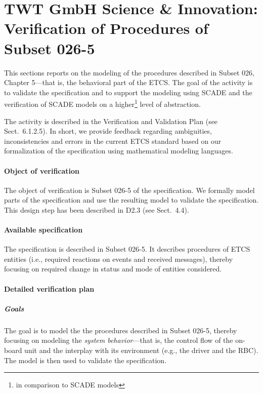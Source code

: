 \section{TWT GmbH Science \& Innovation: Verification of Procedures of Subset
026-5}

This sections reports on the modeling of the procedures described in Subset 026, Chapter 5---that is, the behavioral part of the ETCS. The goal of the activity is to validate the specification and to support the modeling using SCADE and the verification of SCADE models on a higher\footnote{in comparison to SCADE models} level of abstraction.

The activity is described in the Verification and Validation Plan (see Sect.~6.1.2.5). In short, we provide feedback regarding ambiguities, inconsistencies and errors in the current ETCS standard based on our formalization of the specification using mathematical modeling languages.

\paragraph{Object of verification}

The object of verification is Subset 026-5 of the specification. We formally model parts of the specification and use the resulting model to validate the specification. This design step has been described in D2.3 (see Sect.~4.4).

\paragraph{Available specification}

The specification is described in Subset 026-5. It describes procedures of ETCS entities (i.e., required reactions on events and received messages), thereby focusing on required change in status and mode of entities considered.


\paragraph{Detailed verification plan}

\subparagraph{Goals} 

The goal is to model the the procedures described in Subset 026-5, thereby focusing on modeling the \textit{system behavior}---that is, the control flow of the on-board unit and the interplay with its environment (e.g., the driver and the RBC). The model is then used to validate the specification.


